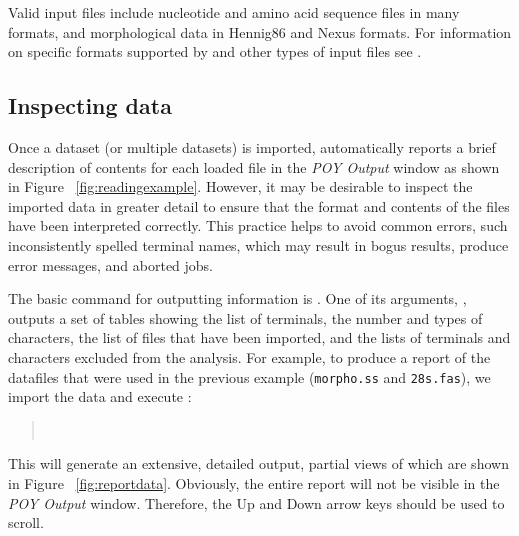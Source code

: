 Valid input files include nucleotide and amino acid sequence files in many formats,
and morphological data in Hennig86 and Nexus formats. For information on specific formats supported by \poy and other types of input files see .

\subsection{Inspecting data}

Once a dataset (or multiple datasets) is imported, \poy automatically reports a brief description of contents for each loaded file in the \emph{POY Output} window as shown in Figure ~\ref{fig:readingexample}. However, it may be desirable to inspect the imported data in greater detail to ensure that the format and contents of the files have been interpreted correctly. This practice helps to avoid common errors, such inconsistently spelled terminal names, which may result in bogus results, produce error messages, and aborted jobs.

The basic command for outputting information is . One of its arguments, , outputs a set of tables showing the list of terminals, the number and types of characters, the list of files that have been imported, and the lists of terminals and characters excluded from the analysis. For example, to produce a report of the datafiles that were used in the previous example (\texttt{morpho.ss} and \texttt{28s.fas}), we import the data and execute :
\begin{quote}
    \\
\end{quote}
This will generate an extensive, detailed output, partial views of which are shown in Figure ~\ref{fig:reportdata}. Obviously, the entire report will not be visible in the \emph{POY Output} window. Therefore, the Up and Down arrow keys should be used to scroll.

